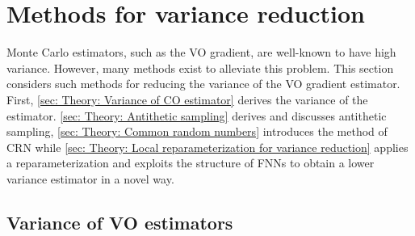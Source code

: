 


\section{Methods for variance reduction}\label{sec: Theory: Methods for variance reduction}
Monte Carlo estimators, such as the \gls{VO} gradient, are well-known to have high variance. However, many methods exist to alleviate this problem. This section considers such methods for reducing the variance of the \gls{VO} gradient estimator. First, \autoref{sec: Theory: Variance of CO estimator} derives the variance of the estimator. \autoref{sec: Theory: Antithetic sampling} derives and discusses antithetic sampling, \autoref{sec: Theory: Common random numbers} introduces the method of \gls{CRN} while \autoref{sec: Theory: Local reparameterization for variance reduction} applies a reparameterization and exploits the structure of \glspl{FNN} to obtain a lower variance estimator in a novel way.


\subsection{Variance of VO estimators}\label{sec: Theory: Variance of CO estimator}

